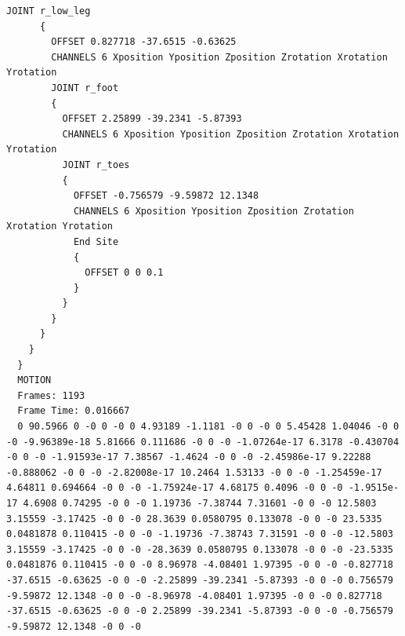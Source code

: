 \documentclass[a4j, fleqn, 12pt]{jsreport}
\begin{document}
\begin{lstlisting}[caption=mocopiのBVHファイル,label=BVH]
      JOINT r_low_leg
      {
        OFFSET 0.827718 -37.6515 -0.63625
        CHANNELS 6 Xposition Yposition Zposition Zrotation Xrotation Yrotation
        JOINT r_foot
        {
          OFFSET 2.25899 -39.2341 -5.87393
          CHANNELS 6 Xposition Yposition Zposition Zrotation Xrotation Yrotation
          JOINT r_toes
          {
            OFFSET -0.756579 -9.59872 12.1348
            CHANNELS 6 Xposition Yposition Zposition Zrotation Xrotation Yrotation
            End Site
            {
              OFFSET 0 0 0.1
            }
          }
        }
      }
    }
  }
  MOTION
  Frames: 1193
  Frame Time: 0.016667
  0 90.5966 0 -0 0 -0 0 4.93189 -1.1181 -0 0 -0 0 5.45428 1.04046 -0 0 -0 -9.96389e-18 5.81666 0.111686 -0 0 -0 -1.07264e-17 6.3178 -0.430704 -0 0 -0 -1.91593e-17 7.38567 -1.4624 -0 0 -0 -2.45986e-17 9.22288 -0.888062 -0 0 -0 -2.82008e-17 10.2464 1.53133 -0 0 -0 -1.25459e-17 4.64811 0.694664 -0 0 -0 -1.75924e-17 4.68175 0.4096 -0 0 -0 -1.9515e-17 4.6908 0.74295 -0 0 -0 1.19736 -7.38744 7.31601 -0 0 -0 12.5803 3.15559 -3.17425 -0 0 -0 28.3639 0.0580795 0.133078 -0 0 -0 23.5335 0.0481878 0.110415 -0 0 -0 -1.19736 -7.38743 7.31591 -0 0 -0 -12.5803 3.15559 -3.17425 -0 0 -0 -28.3639 0.0580795 0.133078 -0 0 -0 -23.5335 0.0481876 0.110415 -0 0 -0 8.96978 -4.08401 1.97395 -0 0 -0 -0.827718 -37.6515 -0.63625 -0 0 -0 -2.25899 -39.2341 -5.87393 -0 0 -0 0.756579 -9.59872 12.1348 -0 0 -0 -8.96978 -4.08401 1.97395 -0 0 -0 0.827718 -37.6515 -0.63625 -0 0 -0 2.25899 -39.2341 -5.87393 -0 0 -0 -0.756579 -9.59872 12.1348 -0 0 -0   
\end{lstlisting}
\end{document}
